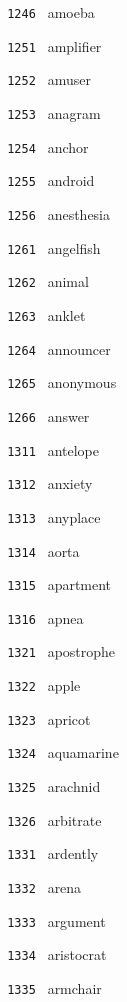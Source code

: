 \documentclass[11pt]{article}
\begin{document}
\begin{multicols}{6}
\noindent \texttt{ 1246 } amoeba  \par
\vspace{3mm}
\noindent \texttt{ 1251 } amplifier  \par
\noindent \texttt{ 1252 } amuser  \par
\noindent \texttt{ 1253 } anagram  \par
\noindent \texttt{ 1254 } anchor  \par
\noindent \texttt{ 1255 } android  \par
\noindent \texttt{ 1256 } anesthesia  \par
\vspace{3mm}
\noindent \texttt{ 1261 } angelfish  \par
\noindent \texttt{ 1262 } animal  \par
\noindent \texttt{ 1263 } anklet  \par
\noindent \texttt{ 1264 } announcer  \par
\noindent \texttt{ 1265 } anonymous  \par
\noindent \texttt{ 1266 } answer  \par
\noindent \texttt{ 1311 } antelope  \par
\noindent \texttt{ 1312 } anxiety  \par
\noindent \texttt{ 1313 } anyplace  \par
\noindent \texttt{ 1314 } aorta  \par
\noindent \texttt{ 1315 } apartment  \par
\noindent \texttt{ 1316 } apnea  \par
\vspace{3mm}
\noindent \texttt{ 1321 } apostrophe  \par
\noindent \texttt{ 1322 } apple  \par
\noindent \texttt{ 1323 } apricot  \par
\noindent \texttt{ 1324 } aquamarine  \par
\noindent \texttt{ 1325 } arachnid  \par
\noindent \texttt{ 1326 } arbitrate  \par
\vspace{3mm}
\noindent \texttt{ 1331 } ardently  \par
\noindent \texttt{ 1332 } arena  \par
\noindent \texttt{ 1333 } argument  \par
\noindent \texttt{ 1334 } aristocrat  \par
\noindent \texttt{ 1335 } armchair  \par

\end{multicols}
\end{document}
